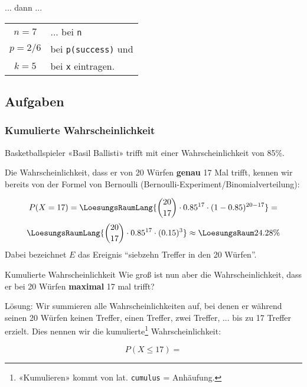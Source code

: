 ... dann ...

\begin{tabular}{c@{ $:$ }l}
  $n=7$   & ... bei \texttt{n} \\
  $p=2/6$ & bei \texttt{p(success)} und \\
  $k=5$   & bei \texttt{x} eintragen.
\end{tabular} 



\subsection*{Aufgaben}



\newpage
\subsubsection{Kumulierte Wahrscheinlichkeit}

Basketballspieler «Basil Ballisti» trifft mit einer
Wahrscheinlichkeit von 85\%.

Die Wahrscheinlichkeit, dass er von 20 Würfen \textbf{genau} 17 Mal trifft, kennen wir
bereits von der Formel von Bernoulli (Bernoulli-Experiment/Binomialverteilung):

$$P(X=17) = \LoesungsRaumLang{{20 \choose 17}\cdot 0.85^{17}\cdot(1-0.85)^{20-17}}=$$
$$\LoesungsRaumLang{{20 \choose 17}\cdot 0.85^{17}\cdot (0.15)^{3}}\approx{}\LoesungsRaum{24.28\%}$$
Dabei bezeichnet $E$ das Ereignis ``siebzehn Treffer in den 20 Würfen''.

\begin{beispiel}{Kumulierte Wahrscheinlichkeit}{}
Wie groß ist nun aber die Wahrscheinlichkeit, dass er bei 20 Würfen
\textbf{maximal} 17 mal trifft?
\end{beispiel}


Lösung: Wir summieren alle Wahrscheinlichkeiten auf, bei denen er
während seinen 20 Würfen
keinen Treffer, einen Treffer, zwei Treffer, ... bis zu 17 Treffer
erzielt. Dies nennen wir die kumulierte\footnote{«Kumulieren» kommt von
  lat. \texttt{cumulus} = Anhäufung.} Wahrscheinlichkeit:

$$P(X\le 17) = $$

